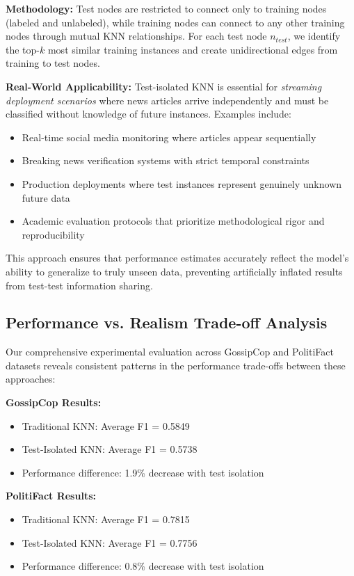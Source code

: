\textbf{Methodology:} Test nodes are restricted to connect only to training nodes (labeled and unlabeled), while training nodes can connect to any other training nodes through mutual KNN relationships. For each test node $n_{test}$, we identify the top-$k$ most similar training instances and create unidirectional edges from training to test nodes.

\textbf{Real-World Applicability:} Test-isolated KNN is essential for \emph{streaming deployment scenarios} where news articles arrive independently and must be classified without knowledge of future instances. Examples include:
\begin{itemize}
    \item Real-time social media monitoring where articles appear sequentially
    \item Breaking news verification systems with strict temporal constraints
    \item Production deployments where test instances represent genuinely unknown future data
    \item Academic evaluation protocols that prioritize methodological rigor and reproducibility
\end{itemize}

This approach ensures that performance estimates accurately reflect the model's ability to generalize to truly unseen data, preventing artificially inflated results from test-test information sharing.

\subsection{Performance vs. Realism Trade-off Analysis}

Our comprehensive experimental evaluation across GossipCop and PolitiFact datasets reveals consistent patterns in the performance trade-offs between these approaches:

\textbf{GossipCop Results:}
\begin{itemize}
    \item Traditional KNN: Average F1 = 0.5849
    \item Test-Isolated KNN: Average F1 = 0.5738
    \item Performance difference: 1.9\% decrease with test isolation
\end{itemize}

\textbf{PolitiFact Results:}
\begin{itemize}
    \item Traditional KNN: Average F1 = 0.7815
    \item Test-Isolated KNN: Average F1 = 0.7756
    \item Performance difference: 0.8\% decrease with test isolation
\end{itemize}

